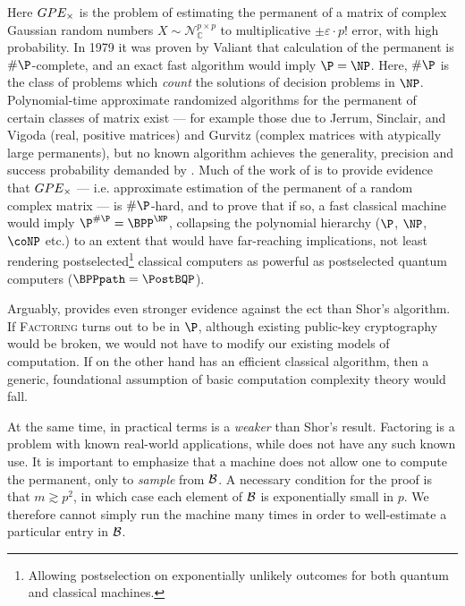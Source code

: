 Here $GPE_\times$ is the problem of estimating the permanent of a matrix of complex Gaussian random numbers $X\sim \mathcal{N}_\mathbb{C}^{p\times p}$ to multiplicative $\pm \varepsilon \cdot p!$ error, with high probability. In 1979 it was proven by Valiant \cite{Valiant1979a} that calculation of the permanent is $\#\P$-complete, and an exact fast algorithm would imply $\P=\NP$. Here, $\#\P$ is the class of problems which \emph{count} the solutions of decision problems in $\NP$. Polynomial-time approximate randomized algorithms for the permanent of certain classes of matrix exist --- for example those due to Jerrum, Sinclair, and Vigoda \cite{Jerrum2004a} (real, positive matrices) and Gurvitz \cite{Gurvits2005} (complex matrices with atypically large permanents), but no known algorithm achieves the generality, precision and success probability demanded by \bosonsampling. Much of the work of \cite{Aaronson2010} is to provide evidence that $GPE_\times$ --- i.e. approximate estimation of the permanent of a random complex matrix --- is $\#\P$-hard,
and to prove that if so, a fast classical  \bosonsampling machine would imply $\P^{\#\P} = \BPP^{\NP}$, collapsing the polynomial hierarchy ($\P$, $\NP$, $\coNP$ etc.) to an extent that would have far-reaching implications, not least rendering postselected\footnote{Allowing postselection on exponentially unlikely outcomes for both quantum and classical machines.} classical computers as powerful as postselected quantum computers ($\BPPpath = \PostBQP$). 

Arguably, \bosonsampling provides even stronger evidence against the \gls{ect} than Shor's algorithm. If \textsc{Factoring} turns out to be in $\P$, although existing public-key cryptography would be broken, we would not have to modify our existing models of computation. If on the other hand \bosonsampling has an efficient classical algorithm, then a generic, foundational assumption of basic computation complexity theory would fall.

At the same time, in practical terms \bosonsampling is a \emph{weaker} than Shor's result. Factoring is a problem with known real-world applications, while \bosonsampling does not have any such known use. 
It is important to emphasize that a \bosonsampling machine does not allow one to compute the permanent, only to \emph{sample} from $\mathcal{B}$. A necessary condition for the proof is that $m \gtrsim p^2$, in which case each element of $\mathcal{B}$ is exponentially small in $p$. We therefore cannot simply run the machine many times in order to well-estimate a particular entry in $\mathcal{B}$.

